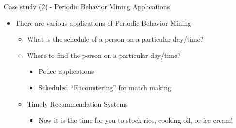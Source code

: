 \documentclass[
 size=14pt,
 paper=smartboard,  %
 mode=present, 		%
 display=slides, 	%
 style=tuliplab,  	%
 pauseslide,
 fleqn,leqno]{powerdot}
\begin{document}
\begin{slide}[toc=,bm=]{Case study (2) - Periodic Behavior Mining Applications}

\begin{itemize}
\item
There are various applications of Periodic Behavior Mining

    \begin{itemize}
    \item
    What is the schedule of a person on a particular day/time?

    \item
    Where to find the person on a particular day/time?
        \begin{itemize}
        \item
        Police applications

        \item
        Scheduled ``Encountering'' for match making
        \end{itemize}
    \item
    Timely Recommendation Systems
        \begin{itemize}
        \item
        Now it is the time for you to stock rice, cooking oil, or ice cream!
        \end{itemize}

\end{itemize}
\end{itemize}

\end{slide}
\end{document}
